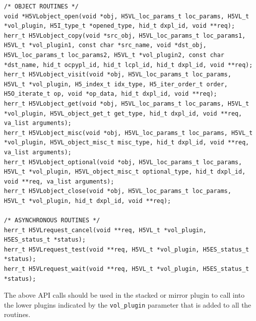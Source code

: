 \begin{lstlisting}
/* OBJECT ROUTINES */
void *H5VLobject_open(void *obj, H5VL_loc_params_t loc_params, H5VL_t *vol_plugin, H5I_type_t *opened_type, hid_t dxpl_id, void **req);
herr_t H5VLobject_copy(void *src_obj, H5VL_loc_params_t loc_params1,
H5VL_t *vol_plugin1, const char *src_name, void *dst_obj,
H5VL_loc_params_t loc_params2, H5VL_t *vol_plugin2, const char *dst_name, hid_t ocpypl_id, hid_t lcpl_id, hid_t dxpl_id, void **req);
herr_t H5VLobject_visit(void *obj, H5VL_loc_params_t loc_params,
H5VL_t *vol_plugin, H5_index_t idx_type, H5_iter_order_t order, H5O_iterate_t op, void *op_data, hid_t dxpl_id, void **req);
herr_t H5VLobject_get(void *obj, H5VL_loc_params_t loc_params, H5VL_t
*vol_plugin, H5VL_object_get_t get_type, hid_t dxpl_id, void **req, va_list arguments);
herr_t H5VLobject_misc(void *obj, H5VL_loc_params_t loc_params, H5VL_t
*vol_plugin, H5VL_object_misc_t misc_type, hid_t dxpl_id, void **req, va_list arguments);
herr_t H5VLobject_optional(void *obj, H5VL_loc_params_t loc_params,
H5VL_t *vol_plugin, H5VL_object_misc_t optional_type, hid_t dxpl_id, void **req, va_list arguments);
herr_t H5VLobject_close(void *obj, H5VL_loc_params_t loc_params, H5VL_t *vol_plugin, hid_t dxpl_id, void **req);

/* ASYNCHRONOUS ROUTINES */
herr_t H5VLrequest_cancel(void **req, H5VL_t *vol_plugin, H5ES_status_t *status);
herr_t H5VLrequest_test(void **req, H5VL_t *vol_plugin, H5ES_status_t *status);
herr_t H5VLrequest_wait(void **req, H5VL_t *vol_plugin, H5ES_status_t *status);
\end{lstlisting}

The above API calls should be used in the stacked or mirror plugin to
call into the lower plugins indicated by the {\tt vol\_plugin}
parameter that is added to all the routines.

